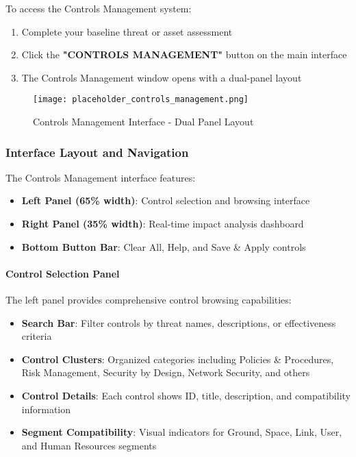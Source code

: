 \documentclass[binding=0.6cm]{sapthesis}
\begin{document}
To access the Controls Management system:
\begin{enumerate}
    \item Complete your baseline threat or asset assessment
    \item Click the \textbf{"CONTROLS MANAGEMENT"} button on the main interface
    \item The Controls Management window opens with a dual-panel layout
\end{enumerate}

\begin{figure}[H]
    \centering
    \texttt{[image: placeholder\_controls\_management.png]}
    \caption{Controls Management Interface - Dual Panel Layout}
    \label{fig:controls_management}
\end{figure}

\subsubsection{Interface Layout and Navigation}

The Controls Management interface features:

\begin{itemize}
    \item \textbf{Left Panel (65\% width)}: Control selection and browsing interface
    \item \textbf{Right Panel (35\% width)}: Real-time impact analysis dashboard
    \item \textbf{Bottom Button Bar}: Clear All, Help, and Save \& Apply controls
\end{itemize}

\paragraph{Control Selection Panel}
The left panel provides comprehensive control browsing capabilities:

\begin{itemize}
    \item \textbf{Search Bar}: Filter controls by threat names, descriptions, or effectiveness criteria
    \item \textbf{Control Clusters}: Organized categories including Policies \& Procedures, Risk Management, Security by Design, Network Security, and others
    \item \textbf{Control Details}: Each control shows ID, title, description, and compatibility information
    \item \textbf{Segment Compatibility}: Visual indicators for Ground, Space, Link, User, and Human Resources segments
\end{itemize}
\end{document}
